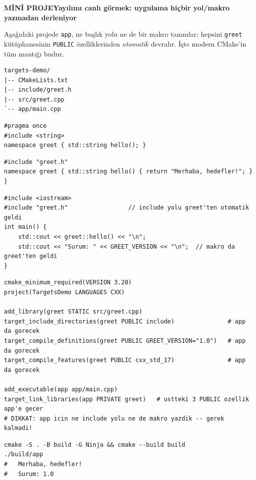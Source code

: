 \documentclass[11pt,a4paper]{article}
\newcommand{\miniproj}[1]{\par\vspace{13pt}\noindent%
  {\setlength{\fboxsep}{7pt}\colorbox{turuncu}{\parbox{\dimexpr\linewidth-2\fboxsep\relax}{%
    \color{white}\bfseries MİNİ PROJE\hspace{0.6em}\textbullet\hspace{0.6em}#1}}}%
  \nopagebreak\par\vspace{7pt}}
\newcommand{\code}[1]{\texttt{\color{koyuGri}#1}}
\begin{document}
\miniproj{Yayılımı canlı görmek: uygulama hiçbir yol/makro yazmadan derleniyor}

Aşağıdaki projede \code{app}, ne başlık yolu ne de bir makro tanımlar; hepsini
\code{greet} kütüphanesinin \code{PUBLIC} özelliklerinden \emph{otomatik}
devralır. İşte modern CMake'in tüm mantığı budur.

\begin{lstlisting}[style=shstyle]
targets-demo/
|-- CMakeLists.txt
|-- include/greet.h
|-- src/greet.cpp
`-- app/main.cpp
\end{lstlisting}

\begin{lstlisting}[style=cppstyle,title={\color{ortaGri}\ttfamily include/greet.h}]
#pragma once
#include <string>
namespace greet { std::string hello(); }
\end{lstlisting}

\begin{lstlisting}[style=cppstyle,title={\color{ortaGri}\ttfamily src/greet.cpp}]
#include "greet.h"
namespace greet { std::string hello() { return "Merhaba, hedefler!"; } }
\end{lstlisting}

\begin{lstlisting}[style=cppstyle,title={\color{ortaGri}\ttfamily app/main.cpp}]
#include <iostream>
#include "greet.h"                 // include yolu greet'ten otomatik geldi
int main() {
    std::cout << greet::hello() << "\n";
    std::cout << "Surum: " << GREET_VERSION << "\n";  // makro da greet'ten geldi
}
\end{lstlisting}

\begin{lstlisting}[title={\color{ortaGri}\ttfamily CMakeLists.txt}]
cmake_minimum_required(VERSION 3.20)
project(TargetsDemo LANGUAGES CXX)

add_library(greet STATIC src/greet.cpp)
target_include_directories(greet PUBLIC include)               # app da gorecek
target_compile_definitions(greet PUBLIC GREET_VERSION="1.0")   # app da gorecek
target_compile_features(greet PUBLIC cxx_std_17)               # app da gorecek

add_executable(app app/main.cpp)
target_link_libraries(app PRIVATE greet)   # ustteki 3 PUBLIC ozellik app'e gecer
# DIKKAT: app icin ne include yolu ne de makro yazdik -- gerek kalmadi!
\end{lstlisting}

\begin{lstlisting}[style=shstyle]
cmake -S . -B build -G Ninja && cmake --build build
./build/app
#   Merhaba, hedefler!
#   Surum: 1.0
\end{lstlisting}
\end{document}
